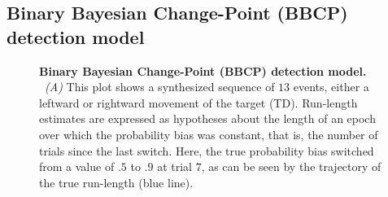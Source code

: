 \documentclass[10pt,letterpaper]{article}
\newcommand{\seeFig}[1]{Figure~\ref{fig:#1}}
\begin{document}
\subsection{Binary Bayesian Change-Point (BBCP) detection model}
\label{sec:Binary_Bayesian_change_point}
\begin{figure}%
\caption{\textbf{Binary Bayesian Change-Point (BBCP) detection model.}
~\textit{(A)}
This plot shows a synthesized sequence of $13$ events,
either a leftward or rightward movement of the target (TD).
Run-length estimates are expressed as hypotheses about the length of an epoch
over which the probability bias was constant,
that is, the number of trials since the last switch.
Here, the true probability bias switched from a value of $.5$ to $.9$ at trial $7$,
as can be seen by the trajectory of the true run-length (blue line).
}
\end{figure}
\end{document}
